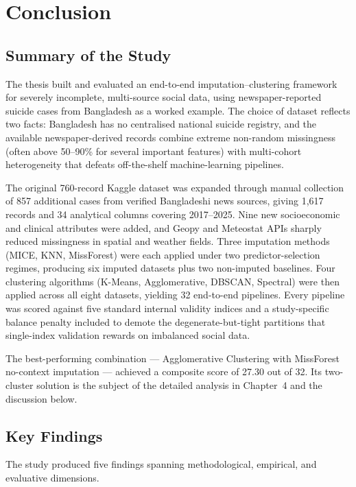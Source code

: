 \chapter{Conclusion}

\section{Summary of the Study}

The thesis built and evaluated an end-to-end imputation--clustering framework for severely incomplete, multi-source social data, using newspaper-reported suicide cases from Bangladesh as a worked example. The choice of dataset reflects two facts: Bangladesh has no centralised national suicide registry, and the available newspaper-derived records combine extreme non-random missingness (often above 50--90\% for several important features) with multi-cohort heterogeneity that defeats off-the-shelf machine-learning pipelines.

The original 760-record Kaggle dataset was expanded through manual collection of 857 additional cases from verified Bangladeshi news sources, giving 1,617 records and 34 analytical columns covering 2017--2025. Nine new socioeconomic and clinical attributes were added, and Geopy and Meteostat APIs sharply reduced missingness in spatial and weather fields. Three imputation methods (MICE, KNN, MissForest) were each applied under two predictor-selection regimes, producing six imputed datasets plus two non-imputed baselines. Four clustering algorithms (K-Means, Agglomerative, DBSCAN, Spectral) were then applied across all eight datasets, yielding 32 end-to-end pipelines. Every pipeline was scored against five standard internal validity indices and a study-specific balance penalty included to demote the degenerate-but-tight partitions that single-index validation rewards on imbalanced social data.

The best-performing combination --- Agglomerative Clustering with MissForest no-context imputation --- achieved a composite score of 27.30 out of 32. Its two-cluster solution is the subject of the detailed analysis in Chapter~4 and the discussion below.

\section{Key Findings}

The study produced five findings spanning methodological, empirical, and evaluative dimensions.

